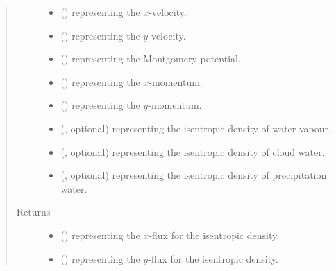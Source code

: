 \documentclass[letterpaper,10pt,english]{sphinxmanual}
\begin{document}
\begin{fulllineitems}
\begin{fulllineitems}
\begin{quote}
\begin{description}
\begin{itemize}
\item {} 
 () \textendash{}  representing the \(x\)-velocity.

\item {} 
 () \textendash{}  representing the \(y\)-velocity.

\item {} 
 () \textendash{}  representing the Montgomery potential.

\item {} 
 () \textendash{}  representing the \(x\)-momentum.

\item {} 
 () \textendash{}  representing the \(y\)-momentum.

\item {} 
 (, optional) \textendash{}  representing the isentropic density of water vapour.

\item {} 
 (, optional) \textendash{}  representing the isentropic density of cloud water.

\item {} 
 (, optional) \textendash{}  representing the isentropic density of precipitation water.

\end{itemize}

\item[{Returns}] \leavevmode
\begin{itemize}
\item {} 
 () \textendash{}  representing the \(x\)-flux for the isentropic density.

\item {} 
 () \textendash{}  representing the \(y\)-flux for the isentropic density.


\end{itemize}
\end{description}
\end{quote}
\end{fulllineitems}
\end{fulllineitems}
\end{document}
